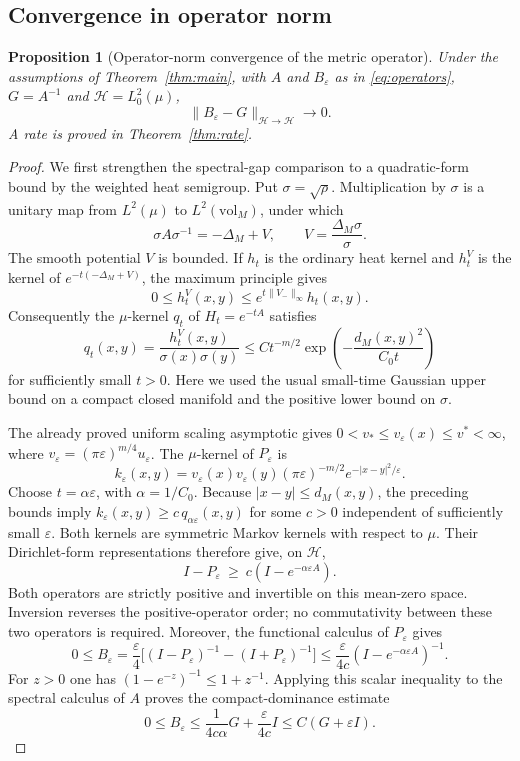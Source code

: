 \documentclass[11pt,a4paper]{article}
\newtheorem{proposition}[theorem]{Proposition}
\theoremstyle{definition}\newtheorem{definition}[theorem]{Definition}
\theoremstyle{remark}\newtheorem{remark}[theorem]{Remark}
\newcommand{\eps}{\varepsilon}
\begin{document}
\subsection{Convergence in operator norm}

\begin{proposition}[Operator-norm convergence of the metric operator]
\label{prop:operator-norm-convergence}
Under the assumptions of Theorem~\ref{thm:main}, with $A$ and $B_\eps$ as in \eqref{eq:operators}, $G=A^{-1}$ and $\mathcal H=L^2_0(\mu)$,
\[
 \|B_\varepsilon-G\|_{\mathcal H\to\mathcal H}
 \longrightarrow0.
\]
A rate is proved in Theorem~\ref{thm:rate}.
\end{proposition}

\begin{proof}
We first strengthen the spectral-gap comparison to a quadratic-form
bound by the weighted heat semigroup.  Put $\sigma=\sqrt\rho$.
Multiplication by $\sigma$ is a unitary map from $L^2(\mu)$ to
$L^2(\mathrm{vol}_M)$, under which
\[
 \sigma A\sigma^{-1}=-\Delta_M+V,
 \qquad V=\frac{\Delta_M\sigma}{\sigma}.
\]
The smooth potential $V$ is bounded.  If $h_t$ is the ordinary heat
kernel and $h_t^V$ is the kernel of $e^{-t(-\Delta_M+V)}$, the
maximum principle gives
\[
 0\le h_t^V(x,y)\le e^{t\|V_-\|_\infty}h_t(x,y).
\]
Consequently the $\mu$-kernel $q_t$ of $H_t=e^{-tA}$ satisfies
\[
 q_t(x,y)=\frac{h_t^V(x,y)}{\sigma(x)\sigma(y)}
 \le C t^{-m/2}
       \exp\!\left(-\frac{d_M(x,y)^2}{C_0t}\right)
\]
for sufficiently small $t>0$.  Here we used the usual small-time
Gaussian upper bound on a compact closed manifold \cite[Corollary 3.1]{LiYau} and the positive
lower bound on $\sigma$.

The already proved uniform scaling asymptotic gives
$0<v_*\le v_\varepsilon(x)\le v^*<\infty$, where
$v_\varepsilon=(\pi\varepsilon)^{m/4}u_\varepsilon$.
The $\mu$-kernel of $P_\varepsilon$ is
\[
 k_\varepsilon(x,y)=
 v_\varepsilon(x)v_\varepsilon(y)
 (\pi\varepsilon)^{-m/2}e^{-|x-y|^2/\varepsilon}.
\]
Choose $t=\alpha\varepsilon$, with $\alpha=1/C_0$.
Because $|x-y|\le d_M(x,y)$, the preceding bounds imply
$k_\varepsilon(x,y)\ge c\,q_{\alpha\varepsilon}(x,y)$ for some
$c>0$ independent of sufficiently small $\varepsilon$.
Both kernels are symmetric Markov kernels with respect to $\mu$.
Their Dirichlet-form representations therefore give, on
$\mathcal H$,
\[
 I-P_\varepsilon\ \ge\ c(I-e^{-\alpha\varepsilon A}).
\]
Both operators are strictly positive and invertible on this
mean-zero space.  Inversion reverses the positive-operator order;
no commutativity between these two operators is required.  Moreover,
the functional calculus of $P_\varepsilon$ gives
\[
 0\le B_\varepsilon
 =\frac{\varepsilon}{4}
  \bigl[(I-P_\varepsilon)^{-1}-(I+P_\varepsilon)^{-1}\bigr]
 \le\frac{\varepsilon}{4c}
       (I-e^{-\alpha\varepsilon A})^{-1}.
\]
For $z>0$ one has $(1-e^{-z})^{-1}\le1+z^{-1}$.
Applying this scalar inequality to the spectral calculus of $A$
proves the compact-dominance estimate
\begin{equation}
\label{eq:compact-dominance}
 0\le B_\varepsilon
 \le\frac1{4c\alpha}G+\frac{\varepsilon}{4c}I
 \le C(G+\varepsilon I).
\end{equation}


\end{proof}
\end{document}
